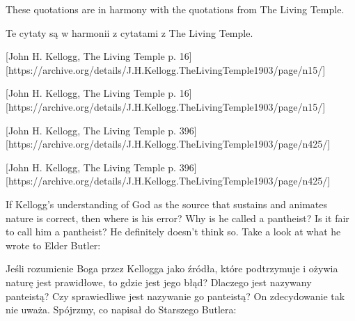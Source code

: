 These quotations are in harmony with the quotations from The Living Temple.


Te cytaty są w harmonii z cytatami z The Living Temple.


[John H. Kellogg, The Living Temple p. 16][https://archive.org/details/J.H.Kellogg.TheLivingTemple1903/page/n15/]


[John H. Kellogg, The Living Temple p. 16][https://archive.org/details/J.H.Kellogg.TheLivingTemple1903/page/n15/]


[John H. Kellogg, The Living Temple p. 396][https://archive.org/details/J.H.Kellogg.TheLivingTemple1903/page/n425/]


[John H. Kellogg, The Living Temple p. 396][https://archive.org/details/J.H.Kellogg.TheLivingTemple1903/page/n425/]


If Kellogg’s understanding of God as the source that sustains and animates nature is correct, then where is his error? Why is he called a pantheist? Is it fair to call him a pantheist? He definitely doesn’t think so. Take a look at what he wrote to Elder Butler:


Jeśli rozumienie Boga przez Kellogga jako źródła, które podtrzymuje i ożywia naturę jest prawidłowe, to gdzie jest jego błąd? Dlaczego jest nazywany panteistą? Czy sprawiedliwe jest nazywanie go panteistą? On zdecydowanie tak nie uważa. Spójrzmy, co napisał do Starszego Butlera:


